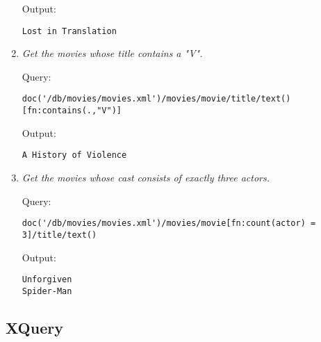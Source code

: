 \documentclass[a4paper, notitlepage]{article}
\begin{document}
\begin{enumerate}
Output:
  
\begin{lstlisting}
Lost in Translation
\end{lstlisting}   

\item 
  \emph{Get the movies whose title contains a "V".} 
  
Query: 
  
\begin{lstlisting}
doc('/db/movies/movies.xml')/movies/movie/title/text()[fn:contains(.,"V")]
\end{lstlisting}
  
Output:
  
\begin{lstlisting}
A History of Violence
\end{lstlisting}   

\item 
  \emph{Get the movies whose cast consists of exactly three actors.} 
  
Query: 
  
\begin{lstlisting}
doc('/db/movies/movies.xml')/movies/movie[fn:count(actor) = 3]/title/text()
\end{lstlisting}
  
Output:
  
\begin{lstlisting}
Unforgiven
Spider-Man
\end{lstlisting}   
  
\end{enumerate}

\subsection{XQuery}
\end{document}
